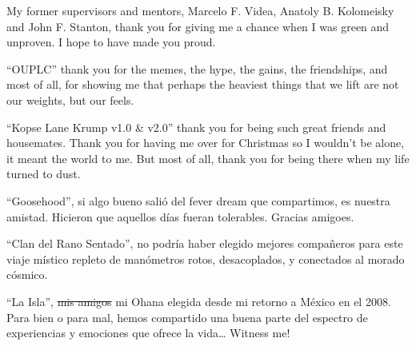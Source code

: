 \begin{frontmatter}[Acknowledgements]
\begin{justify}
        My former supervisors and mentors, Marcelo F. Videa, Anatoly B. Kolomeisky and John F. Stanton, thank you for giving me a chance when I was green and unproven. I hope to have made you proud.

        ``OUPLC'' thank you for the memes, the hype, the gains, the friendships, and most of all, for showing me that perhaps the heaviest things that we lift are not our weights, but our feels.

        ``Kopse Lane Krump v1.0 \& v2.0'' thank you for being such great friends and housemates. Thank you for having me over for Christmas so I wouldn't be alone, it meant the world to me. But most of all, thank you for being there when my life turned to dust.

        ``Goosehood'', si algo bueno salió del fever dream que compartimos, es nuestra amistad. Hicieron que aquellos días fueran tolerables. Gracias amigoes.

        ``Clan del Rano Sentado'', no podría haber elegido mejores compañeros para este viaje místico repleto de manómetros rotos, desacoplados, y conectados al morado cósmico.

        ``La Isla'', \sout{mis amigos} mi Ohana elegida desde mi retorno a México en el 2008. Para bien o para mal, hemos compartido una buena parte del espectro de experiencias y emociones que ofrece la vida\ldots{} Witness me!
    \end{justify}

\end{frontmatter}
